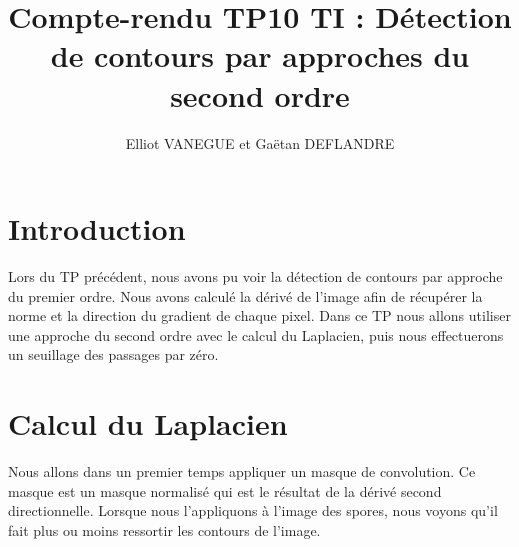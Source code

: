 \documentclass[a4paper,11pt]{article}
\title{Compte-rendu TP10 TI : Détection de contours par approches du second ordre}
\author{Elliot VANEGUE et Gaëtan DEFLANDRE}
\begin{document}


  \maketitle
  
  \mbox{}
  \newpage
  \clearpage
  
  \section*{Introduction}
   Lors du TP précédent, nous avons pu voir la détection de contours par approche du premier ordre. Nous avons
   calculé la dérivé de l'image afin de récupérer la norme et la direction du gradient de chaque pixel. Dans ce TP
   nous allons utiliser une approche du second ordre avec le calcul du Laplacien, puis nous effectuerons un seuillage
   des passages par zéro.

  \section{Calcul du Laplacien}
  Nous allons dans un premier temps appliquer un masque de convolution. Ce masque est un masque normalisé
  qui est le résultat de la dérivé second directionnelle. Lorsque nous l'appliquons à l'image des spores, nous
  voyons qu'il fait plus ou moins ressortir les contours de l'image.\\
  
\end{document}
